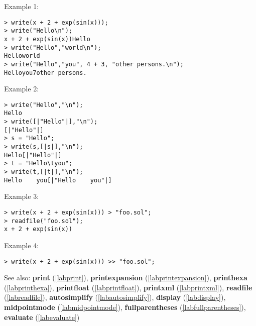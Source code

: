 \noindent Example 1: 
\begin{center}\begin{minipage}{15cm}\begin{Verbatim}[frame=single]
> write(x + 2 + exp(sin(x))); 
> write("Hello\n");
x + 2 + exp(sin(x))Hello
> write("Hello","world\n");
Helloworld
> write("Hello","you", 4 + 3, "other persons.\n");
Helloyou7other persons.
\end{Verbatim}
\end{minipage}\end{center}
\noindent Example 2: 
\begin{center}\begin{minipage}{15cm}\begin{Verbatim}[frame=single]
> write("Hello","\n");
Hello
> write([|"Hello"|],"\n");
[|"Hello"|]
> s = "Hello";
> write(s,[|s|],"\n");
Hello[|"Hello"|]
> t = "Hello\tyou";
> write(t,[|t|],"\n");
Hello    you[|"Hello    you"|]
\end{Verbatim}
\end{minipage}\end{center}
\noindent Example 3: 
\begin{center}\begin{minipage}{15cm}\begin{Verbatim}[frame=single]
> write(x + 2 + exp(sin(x))) > "foo.sol";
> readfile("foo.sol");
x + 2 + exp(sin(x))
\end{Verbatim}
\end{minipage}\end{center}
\noindent Example 4: 
\begin{center}\begin{minipage}{15cm}\begin{Verbatim}[frame=single]
> write(x + 2 + exp(sin(x))) >> "foo.sol";
\end{Verbatim}
\end{minipage}\end{center}
See also: \textbf{print} (\ref{labprint}), \textbf{printexpansion} (\ref{labprintexpansion}), \textbf{printhexa} (\ref{labprinthexa}), \textbf{printfloat} (\ref{labprintfloat}), \textbf{printxml} (\ref{labprintxml}), \textbf{readfile} (\ref{labreadfile}), \textbf{autosimplify} (\ref{labautosimplify}), \textbf{display} (\ref{labdisplay}), \textbf{midpointmode} (\ref{labmidpointmode}), \textbf{fullparentheses} (\ref{labfullparentheses}), \textbf{evaluate} (\ref{labevaluate})
